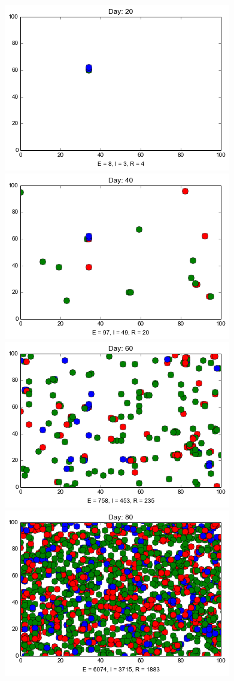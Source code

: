 \begin{minipage}{\linewidth}
\medskip
\includegraphics[scale=0.28]{images/4t20.png} \quad
\includegraphics[scale=0.28]{images/4t40.png} \quad
\includegraphics[scale=0.28]{images/4t60.png} \quad
\includegraphics[scale=0.28]{images/4t80.png} 


\end{minipage}
